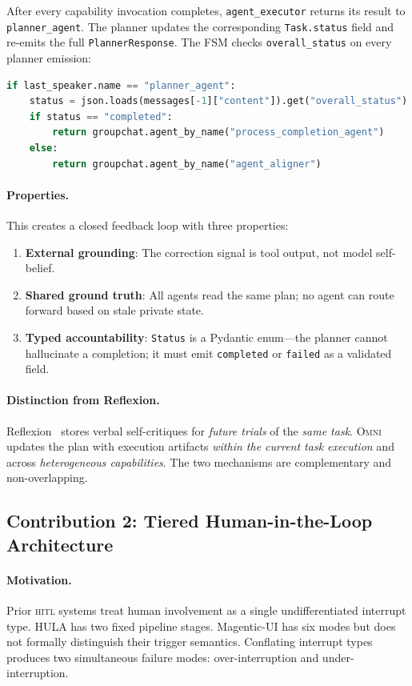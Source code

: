 \documentclass[11pt,a4paper]{article}
\newcommand{\omni}{\textsc{Omni}}
\newcommand{\hitl}{\textsc{hitl}}
\begin{document}
After every capability invocation completes, \texttt{agent\_executor} returns its result to \texttt{planner\_agent}. The planner updates the corresponding \texttt{Task.status} field and re-emits the full \texttt{PlannerResponse}. The FSM checks \texttt{overall\_status} on every planner emission:

\begin{lstlisting}[language=Python]
if last_speaker.name == "planner_agent":
    status = json.loads(messages[-1]["content"]).get("overall_status")
    if status == "completed":
        return groupchat.agent_by_name("process_completion_agent")
    else:
        return groupchat.agent_by_name("agent_aligner")
\end{lstlisting}

\paragraph{Properties.} This creates a closed feedback loop with three properties:
\begin{enumerate}[topsep=2pt, itemsep=1pt]
  \item \textbf{External grounding}: The correction signal is tool output, not model self-belief.
  \item \textbf{Shared ground truth}: All agents read the same plan; no agent can route forward based on stale private state.
  \item \textbf{Typed accountability}: \texttt{Status} is a Pydantic enum---the planner cannot hallucinate a completion; it must emit \texttt{completed} or \texttt{failed} as a validated field.
\end{enumerate}

\paragraph{Distinction from Reflexion.} Reflexion~\cite{shinn2023reflexion} stores verbal self-critiques for \emph{future trials} of the \emph{same task}. \omni{} updates the plan with execution artifacts \emph{within the current task execution} and across \emph{heterogeneous capabilities}. The two mechanisms are complementary and non-overlapping.

\subsection{Contribution 2: Tiered Human-in-the-Loop Architecture}
\label{sec:hitl}

\paragraph{Motivation.} Prior \hitl{} systems treat human involvement as a single undifferentiated interrupt type. HULA has two fixed pipeline stages. Magentic-UI has six modes but does not formally distinguish their trigger semantics. Conflating interrupt types produces two simultaneous failure modes: over-interruption and under-interruption.
\end{document}
